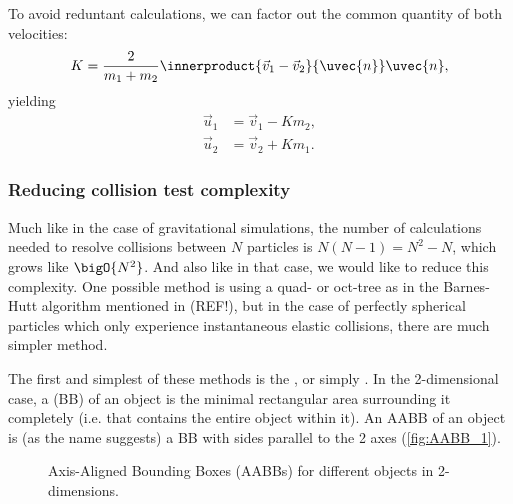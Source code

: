 To avoid reduntant calculations, we can factor out the common quantity of both velocities:
\begin{equation}
	K = \frac{2}{m_{1}+m_{2}}\innerproduct{\vec{v}_{1}-\vec{v}_{2}}{\uvec{n}}\uvec{n},
	\label{eq:elastic_collision_common_quantity}
\end{equation}
yielding
\begin{equation}
	\begin{aligned}
		\vec{u}_{1} & = \vec{v}_{1}-Km_{2}, \\
		\vec{u}_{2} & = \vec{v}_{2}+Km_{1}.
	\end{aligned}
	\label{eq:elastic_collision_final_equation}
\end{equation}

\subsubsection{Reducing collision test complexity}
Much like in the case of gravitational simulations, the number of calculations needed to resolve collisions between $N$ particles is $N(N-1)=N^{2}-N$, which grows like $\bigO{N^{2}}$. And also like in that case, we would like to reduce this complexity. One possible method is using a quad- or oct-tree as in the Barnes-Hutt algorithm mentioned in (REF!), but in the case of perfectly spherical particles which only experience instantaneous elastic collisions, there are much simpler method.

The first and simplest of these methods is the , or simply . In the 2-dimensional case, a  (BB) of an object is the minimal rectangular area surrounding it completely (i.e. that contains the entire object within it). An AABB of an object is (as the name suggests) a BB with sides parallel to the 2 axes (\autoref{fig:AABB_1}).

\begin{figure}
	\begin{center}
	\end{center}
	\caption{Axis-Aligned Bounding Boxes (AABBs) for different objects in 2-dimensions.}
	\label{fig:AABB_1}
\end{figure}

